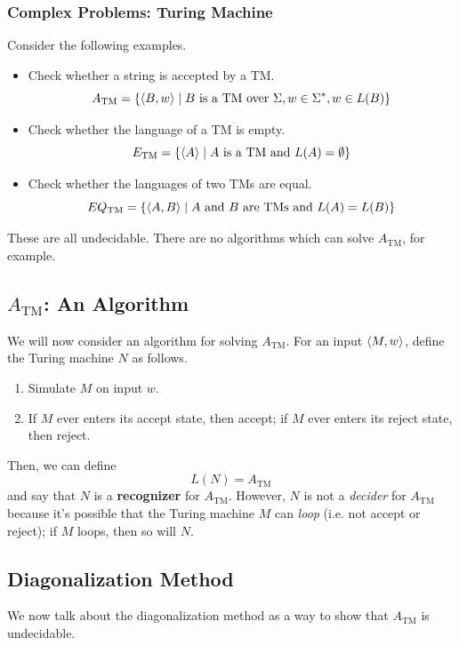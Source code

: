 \documentclass[letterpaper]{article}
\begin{document}
\subsubsection{Complex Problems: Turing Machine}
Consider the following examples.
\begin{itemize}
    \item Check whether a string is accepted by a TM. 
    \[A_{\text{TM}} = \{\langle B, w \rangle \mid B \text{ is a TM over } \Sigma, w \in \Sigma^*, w \in L(B)\}\]

    \item Check whether the language of a TM is empty. 
    \[E_{\text{TM}} = \{\langle A \rangle \mid A \text{ is a TM and } L(A) = \emptyset\}\]
    
    \item Check whether the languages of two TMs are equal.
    \[EQ_{\text{TM}} = \{\langle A, B \rangle \mid A \text{ and } B \text{ are TMs and } L(A) = L(B)\}\]
\end{itemize}
These are all undecidable. There are no algorithms which can solve $A_{\text{TM}}$, for example.

\subsection{\texorpdfstring{$A_{\text{TM}}$}{Checking if TM Accepts String}: An Algorithm}
We will now consider an algorithm for solving $A_{\text{TM}}$. For an input $\langle M, w \rangle$, define the Turing machine $N$ as follows.
\begin{enumerate}
    \item Simulate $M$ on input $w$. 
    \item If $M$ ever enters its accept state, then accept; if $M$ ever enters its reject state, then reject.
\end{enumerate}
Then, we can define
\[L(N) = A_{\text{TM}}\]
and say that $N$ is a \textbf{recognizer} for $A_{\text{TM}}$. However, $N$ is not a \emph{decider} for $A_{\text{TM}}$ because it's possible that the Turing machine $M$ can \emph{loop} (i.e. not accept or reject); if $M$ loops, then so will $N$.

\subsection{Diagonalization Method}
We now talk about the diagonalization method as a way to show that $A_{\text{TM}}$ is undecidable.
\end{document}
